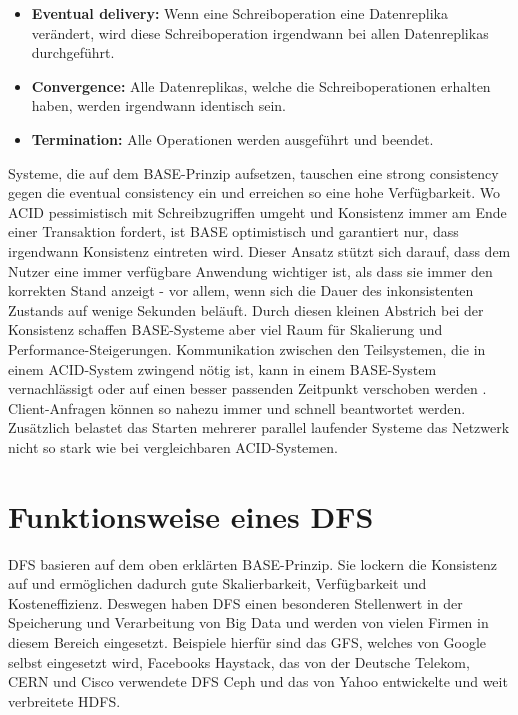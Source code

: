 \documentclass[12pt,oneside,a4paper,parskip]{scrbook}
\begin{document}
\begin{itemize}
  \item \textbf{Eventual delivery:} Wenn eine Schreiboperation eine Datenreplika verändert, wird diese Schreiboperation irgendwann bei allen Datenreplikas durchgeführt.
  \item \textbf{Convergence:} Alle Datenreplikas, welche die Schreiboperationen erhalten haben, werden irgendwann identisch sein.
  \item \textbf{Termination:} Alle Operationen werden ausgeführt und beendet.
\end{itemize}
Systeme, die auf dem BASE-Prinzip aufsetzen, tauschen eine strong consistency gegen die eventual consistency ein und erreichen so eine hohe Verfügbarkeit. Wo ACID pessimistisch mit Schreibzugriffen umgeht und Konsistenz immer am Ende einer Transaktion fordert, ist BASE optimistisch und garantiert nur, dass irgendwann Konsistenz eintreten wird. Dieser Ansatz stützt sich darauf, dass dem Nutzer eine immer verfügbare Anwendung wichtiger ist, als dass sie immer den korrekten Stand anzeigt - vor allem, wenn sich die Dauer des inkonsistenten Zustands auf wenige Sekunden beläuft. Durch diesen kleinen Abstrich bei der Konsistenz schaffen BASE-Systeme aber viel Raum für Skalierung und Performance-Steigerungen. Kommunikation zwischen den Teilsystemen, die in einem ACID-System zwingend nötig ist, kann in einem BASE-System vernachlässigt oder auf einen besser passenden Zeitpunkt verschoben werden \cite{clusterBASE}. Client-Anfragen können so nahezu immer und schnell beantwortet werden. Zusätzlich belastet das Starten mehrerer parallel laufender Systeme das Netzwerk nicht so stark wie bei vergleichbaren ACID-Systemen.

\section{Funktionsweise eines DFS}
DFS basieren auf dem oben erklärten BASE-Prinzip. Sie lockern die Konsistenz auf und ermöglichen dadurch gute Skalierbarkeit, Verfügbarkeit und Kosteneffizienz. Deswegen haben DFS einen besonderen Stellenwert in der Speicherung und Verarbeitung von Big Data und werden von vielen Firmen in diesem Bereich eingesetzt. Beispiele hierfür sind das GFS, welches von Google selbst eingesetzt wird, Facebooks Haystack, das von der Deutsche Telekom, CERN und Cisco verwendete DFS Ceph \cite{ceph} und das von Yahoo entwickelte und weit verbreitete HDFS.
\end{document}
